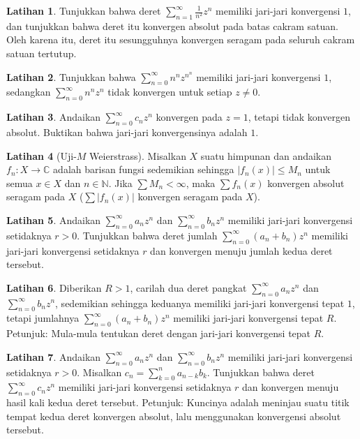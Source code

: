 \documentclass[12pt,openany]{book}
\newcommand{\sabs}[1]{\lvert {#1} \rvert}
\newcommand{\abs}[1]{\left\lvert {#1} \right\rvert}
\newcommand{\C}{{\mathbb{C}}}
\newcommand{\N}{{\mathbb{N}}}
\theoremstyle{plain}
\theoremstyle{remark}
\theoremstyle{definition}
\newenvironment{exbox}{%
    \def\FrameCommand{\vrule width 1pt \relax\hspace{10pt}}%
    \MakeFramed{\advance\hsize-\width\FrameRestore}%
}{%
    \endMakeFramed
}
\theoremstyle{exercise}
\newtheorem{exercise}{Latihan}[section]
\theoremstyle{example}
\begin{document}
\begin{exbox}
\begin{exercise}
Tunjukkan bahwa deret $\sum_{n=1}^\infty \frac{1}{n^2} z^{n}$ memiliki jari-jari
konvergensi $1$, dan
tunjukkan bahwa deret itu konvergen absolut pada batas cakram satuan.  Oleh karena itu,
deret itu sesungguhnya konvergen seragam pada seluruh cakram satuan tertutup.
\end{exercise}

\begin{exercise}
Tunjukkan bahwa
$\sum_{n=0}^\infty n^n z^{n^n}$ memiliki jari-jari konvergensi $1$,
sedangkan
$\sum_{n=0}^\infty n^n z^{n}$ tidak konvergen
untuk setiap $z \neq 0$.
\end{exercise}

\begin{exercise}
Andaikan
$\sum_{n=0}^\infty c_n z^{n}$ konvergen pada $z=1$, tetapi tidak konvergen absolut.
Buktikan bahwa jari-jari konvergensinya adalah $1$.
\end{exercise}

\begin{exercise}[Uji-$M$ Weierstrass]
\label{exercise:weierMtest}
Misalkan $X$ suatu himpunan dan andaikan $f_n \colon X \to \C$ adalah
barisan fungsi sedemikian sehingga
$\abs{f_n(x)} \leq M_n$ untuk semua $x \in X$ dan $n \in \N$.  Jika $\sum M_n <
\infty$, maka $\sum f_n(x)$ konvergen absolut seragam pada $X$
($\sum \sabs{f_n(x)}$ konvergen seragam pada $X$).
\end{exercise}

\begin{exercise}
Andaikan
$\sum_{n=0}^\infty a_n z^{n}$ dan $\sum_{n=0}^\infty b_n z^{n}$
memiliki jari-jari konvergensi setidaknya $r > 0$.  Tunjukkan bahwa
deret jumlah
$\sum_{n=0}^\infty (a_n+b_n) z^{n}$ memiliki jari-jari konvergensi setidaknya
$r$ dan konvergen menuju jumlah kedua deret tersebut.
\end{exercise}

\begin{exercise}
Diberikan $R > 1$, carilah dua deret pangkat
$\sum_{n=0}^\infty a_n z^{n}$ dan $\sum_{n=0}^\infty b_n z^{n}$,
sedemikian sehingga keduanya memiliki jari-jari konvergensi tepat $1$, tetapi
jumlahnya
$\sum_{n=0}^\infty (a_n+b_n) z^{n}$ memiliki jari-jari konvergensi
tepat $R$.  Petunjuk: Mula-mula tentukan deret dengan jari-jari konvergensi
tepat $R$.
\end{exercise}

\begin{exercise}
Andaikan
$\sum_{n=0}^\infty a_n z^{n}$ dan $\sum_{n=0}^\infty b_n z^{n}$
memiliki jari-jari konvergensi setidaknya $r > 0$.  Misalkan
$c_n = \sum_{k=0}^n a_{n-k}b_k$.  Tunjukkan bahwa
deret
$\sum_{n=0}^\infty c_n z^{n}$ memiliki jari-jari konvergensi setidaknya
$r$ dan konvergen menuju hasil kali kedua deret tersebut.
Petunjuk: Kuncinya adalah meninjau suatu titik tempat kedua deret konvergen absolut,
lalu menggunakan konvergensi absolut tersebut.
\end{exercise}


\end{exbox}
\end{document}
